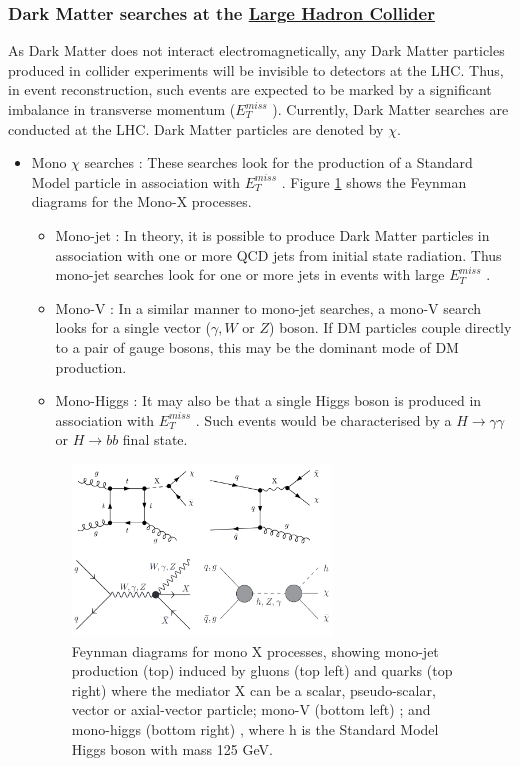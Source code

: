 \documentclass[11pt,a4paper,openright,twoside]{report}
\newcommand{\met}{$E_T^{miss}$ }
\begin{document}
\subsubsection{Dark Matter searches at the \hyperref[ch:LHC]{Large Hadron Collider}}
As Dark Matter does not interact electromagnetically, any Dark Matter particles produced in collider experiments will be invisible to detectors at the LHC. Thus, in event reconstruction, such events are expected to be marked by a significant imbalance in transverse momentum (\met). Currently, Dark Matter searches are conducted at the LHC\cite{DM_searches}. Dark Matter particles are denoted by $\chi$.
\begin{itemize}
\item Mono $\chi$ searches : These searches look for the production of a Standard Model particle in association with \met. Figure \ref{fig:Mono_X} shows the Feynman diagrams for the Mono-X processes.
	\begin{itemize}
	\item Mono-jet : In theory, it is possible to produce Dark Matter particles in association with one or more QCD jets from initial state radiation. Thus mono-jet searches look for one or more jets in events with large \met.
	\item Mono-V : In a similar manner to mono-jet searches, a mono-V search looks for a single vector ($\gamma,W$ or $Z$) boson. If DM particles couple directly to a pair of gauge bosons, this may be the dominant mode of DM production.
	\item Mono-Higgs : It may also be that a single Higgs boson is produced in association with \met. Such events would be characterised by a $H\to\gamma\gamma$ or $H\to bb$ final state.
	\end{itemize}
	
\begin{figure}[H]
\centering
\includegraphics[width=0.65\textwidth]{Mono_X.png}
\caption{Feynman diagrams for mono X processes, showing mono-jet production (top) induced by gluons (top left) and quarks (top right) \cite{mono_j} where the mediator X can be a scalar, pseudo-scalar, vector or axial-vector particle; mono-V (bottom left) \cite{mono_V}; and mono-higgs (bottom right) \cite{mono_h}, where h is the Standard Model Higgs boson with mass 125 GeV.}
\label{fig:Mono_X}
\end{figure}


\end{itemize}
\end{document}
